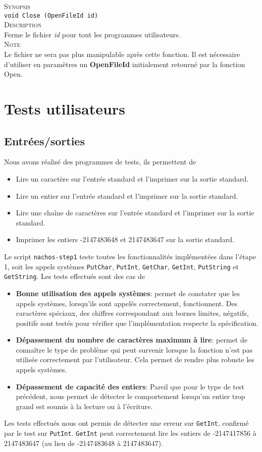 \documentclass{report}
\begin{document}
\textsc{Synopsis}\\	
	\texttt{void Close (OpenFileId id)}\\
	
\textsc{Description}\\
	Ferme le fichier \textit{id} pour tout les programmes utilisateurs.  \\	
	
\textsc{Note}\\
	Le fichier ne sera pas plus manipulable après cette fonction. Il est nécessaire d'utiliser en paramètres un \textbf{OpenFileId} initialement retourné par la fonction Open.\\	
	

\section*{Tests utilisateurs}
\subsection*{Entrées/sorties}
\noindent
Nous avons réalisé des programmes de tests, ils permettent de
\begin{itemize}
 \item Lire un caractère sur l'entrée standard et l'imprimer sur la sortie standard.
 \item Lire un entier sur l'entrée standard et l'imprimer sur la sortie standard.
 \item Lire une chaîne de caractères sur l'entrée standard et l'imprimer sur la sortie
 standard.
 \item Imprimer les entiers -2147483648 et 2147483647 sur la sortie standard.
\end{itemize}
Le script \texttt{nachos-step1} teste toutes les fonctionnalités implémentées dans l'étape 1, soit les appels systèmes \texttt{PutChar}, \texttt{PutInt}, \texttt{GetChar}, \texttt{GetInt}, \texttt{PutString} et \texttt{GetString}.
Les tests effectués sont des cas de
\begin{itemize}
 \item \textbf{Bonne utilisation des appels systèmes}: permet de constater que les appels systèmes, lorsqu'ils sont appelés correctement, fonctionnent. Des caractères spéciaux, des chiffres correspondant aux bornes limites, négatifs, positifs sont testés pour vérifier que l'implémentation respecte la spécification.
 \item \textbf{Dépassement du nombre de caractères maximum à lire}: permet de connaître le type de problème qui peut survenir lorsque la fonction n'est pas utilisée correctement par l'utilisateur. Cela permet de rendre plus robuste les appels systèmes.
 \item \textbf{Dépassement de capacité des entiers}: Pareil que pour le type de test précédent, nous permet de détecter le comportement lorsqu'un entier trop grand est soumis à la lecture ou à l'écriture.
\end{itemize}
Les tests effectués nous ont permis de détecter une erreur sur \texttt{GetInt}, confirmé par le test sur \texttt{PutInt}. \texttt{GetInt} peut correctement lire les entiers de -2147417856 à 2147483647 (au lieu de -2147483648 à 2147483647).
\end{document}
